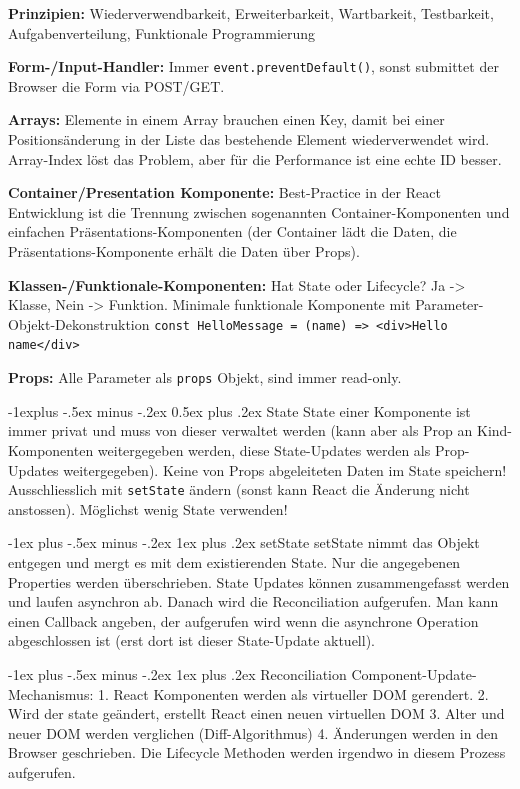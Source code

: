 \documentclass[a4paper, fontsize=6pt]{scrartcl}
\makeatletter
\renewcommand{\subsection}{\@startsection{subsection}{2}{0mm}%
    {-1explus -.5ex minus -.2ex}%
    {0.5ex plus .2ex}%
    {\normalfont\normalsize\bfseries}}
\renewcommand{\subsubsection}{\@startsection{subsubsection}{3}{0mm}%
    {-1ex plus -.5ex minus -.2ex}%
    {1ex plus .2ex}%
    {\normalfont\small\bfseries}}
\newcommand{\js}[1]{\texttt{#1}}
\makeatother
\begin{document}
\begin{multicols*}{5}
\textbf{Prinzipien:} Wiederverwendbarkeit, Erweiterbarkeit, Wartbarkeit, Testbarkeit, Aufgabenverteilung, Funktionale Programmierung

\textbf{Form-/Input-Handler:} Immer \js{event.preventDefault()}, sonst submittet der Browser die Form via POST/GET. 
  
\textbf{Arrays:} Elemente in einem Array brauchen einen Key, damit bei einer Positionsänderung in der Liste das bestehende Element wiederverwendet wird. Array-Index löst das Problem, aber für die Performance ist eine echte ID besser.

\textbf{Container/Presentation Komponente:} Best-Practice in der React Entwicklung ist die Trennung zwischen sogenannten Container-Komponenten und einfachen Präsentations-Komponenten (der Container lädt die Daten, die Präsentations-Komponente erhält die Daten über Props).

\textbf{Klassen-/Funktionale-Komponenten:} Hat State oder Lifecycle? Ja -> Klasse, Nein -> Funktion. Minimale funktionale Komponente mit Parameter-Objekt-Dekonstruktion \js{const HelloMessage = ({name}) => <div>Hello {name}</div>}

\textbf{Props:} Alle Parameter als \js{props} Objekt, sind immer read-only.

\subsection{State}
State einer Komponente ist immer privat und muss von dieser verwaltet werden (kann aber als Prop an Kind-Komponenten weitergegeben werden, diese State-Updates werden als Prop-Updates weitergegeben). Keine von Props abgeleiteten Daten im State speichern! Ausschliesslich mit \js{setState} ändern (sonst kann React die Änderung nicht anstossen). Möglichst wenig State verwenden!

\subsubsection{setState}
setState nimmt das Objekt entgegen und mergt es mit dem existierenden State. Nur die angegebenen Properties werden überschrieben. State Updates können zusammengefasst werden und laufen asynchron ab. Danach wird die Reconciliation aufgerufen. Man kann einen Callback angeben, der aufgerufen wird wenn die asynchrone Operation abgeschlossen ist (erst dort ist dieser State-Update aktuell).

\subsubsection{Reconciliation}
Component-Update-Mechanismus: 1. React Komponenten werden als virtueller DOM gerendert. 2. Wird der state geändert, erstellt React einen neuen virtuellen DOM 3. Alter und neuer DOM werden verglichen (Diff-Algorithmus) 4. Änderungen werden in den Browser geschrieben. Die Lifecycle Methoden werden irgendwo in diesem Prozess aufgerufen.


\end{multicols*}
\end{document}
